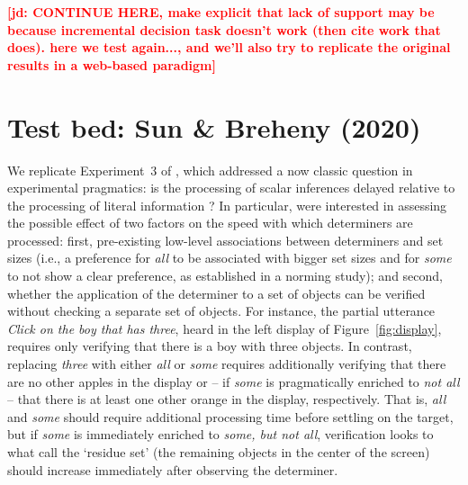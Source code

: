 \documentclass[10pt,letterpaper]{article}
\newcommand{\figref}[1]{Figure~\ref{#1}}
\newcommand{\expref}[1]{Experiment~#1}
\newcommand{\jd}[1]{\textcolor{Red}{\textbf{[jd: #1]}}}
\begin{document}
\jd{CONTINUE HERE, make explicit that lack of support may be because incremental decision task doesn't work (then cite work that does)\cite{Allopenna1998,QingLD2018, KreissDegen2020, alsop2018}. here we test again..., and we'll also try to replicate the original results in a web-based paradigm}




\section{Test bed: Sun \& Breheny (2020)}

We replicate \expref{3} of , which addressed a now classic question in experimental pragmatics: is the processing of scalar inferences delayed relative to the processing of literal information \cite{bott2004, Breheny2006, huang2009, grodner2010, DegenTanenhaus2015, DegenT2016, Tomlinson2013}? In particular,   were interested in assessing the possible effect of two factors on the speed with which determiners are processed: first, pre-existing low-level associations between determiners and set sizes (i.e., a preference for \emph{all} to be associated with bigger set sizes and for \emph{some} to not show a clear preference, as established in a norming study); and second, whether the application of the determiner to a set of objects can be verified without checking a separate set of objects. For instance, the partial utterance \emph{Click on the boy that has three}, heard in the left display of \figref{fig:display}, requires only verifying that there is a boy with three objects. In contrast, replacing \emph{three} with either \emph{all} or \emph{some} requires additionally verifying that there are no other apples in the display or -- if \emph{some} is pragmatically enriched to \emph{not all} --  that there is at least one other orange in the display, respectively. That is, \emph{all} and \emph{some} should require additional processing time before settling on the target, but if \emph{some} is immediately enriched to \emph{some, but not all}, verification looks to what  call the `residue set' (the remaining objects in the center of the screen) should increase immediately after observing the determiner. 
\end{document}
